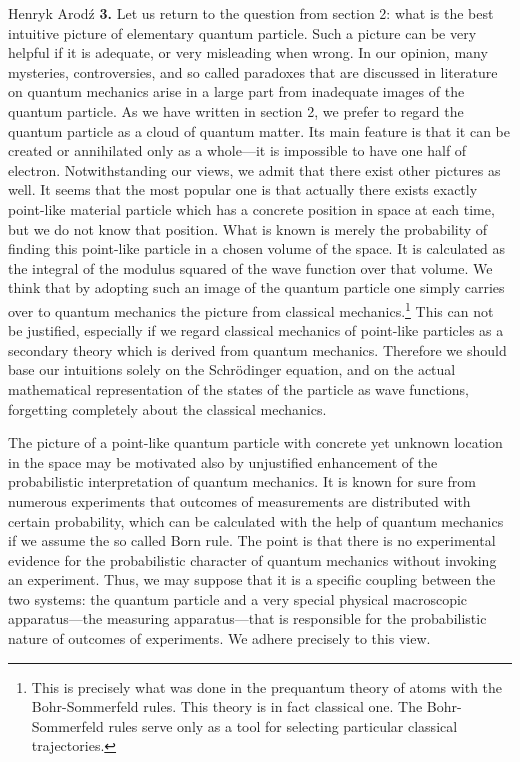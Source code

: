 \begin{artengenv}{Henryk Arod\'z}
{\bf 3.} Let us return to the question from section 2: what is the best intuitive picture of elementary quantum particle. Such a picture can be very helpful if it is adequate, or very misleading when wrong. In our opinion, many mysteries, controversies, and so called paradoxes that are discussed in literature on quantum mechanics arise in a large part from inadequate images of the quantum particle. As we have written in section 2, we prefer to regard
 the quantum particle as a cloud of quantum matter. Its main feature is that it can be created or annihilated only as a whole---it is impossible to have one half of electron. Notwithstanding our views, we admit that there exist other pictures as well. It seems that the most popular one is that actually there exists exactly point-like material particle which has a concrete position in space at each time, but we do not know that position. What is known is merely the probability of finding this point-like particle in a chosen volume of the space. It is calculated as the integral of the modulus squared of the wave function over that volume. We think that by adopting such an image of the quantum particle one simply carries over to quantum mechanics the picture from classical mechanics.\footnote{This is precisely what was done in the prequantum theory of atoms with the Bohr-Sommerfeld rules. This theory is in fact classical one. The Bohr-Sommerfeld rules serve only as a tool for selecting particular classical trajectories.} This can not be justified, especially if we regard classical mechanics of point-like particles as a secondary theory which is derived from quantum mechanics. Therefore we should base our intuitions solely on the Schr\"odinger equation, and on the actual mathematical representation of the states of the particle as wave functions, forgetting completely about the classical mechanics. 

The picture of a point-like quantum particle with concrete yet unknown location in the space may be motivated also by unjustified enhancement of the probabilistic interpretation of quantum mechanics. It is known for sure from numerous experiments that outcomes of measurements are distributed with certain probability, which can be calculated with the help of quantum mechanics if we assume the so called Born rule. The point is that there is no experimental evidence for the probabilistic character of quantum mechanics without invoking an experiment. Thus, we may suppose that it is a specific coupling between the two systems: the quantum particle and a very special physical macroscopic apparatus---the measuring apparatus---that is responsible for the probabilistic nature of outcomes of experiments. We adhere precisely to this view. 


\end{artengenv}
